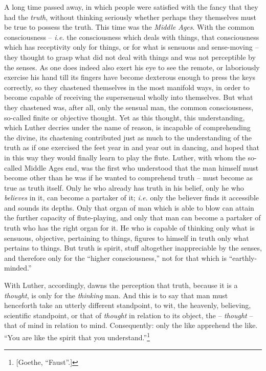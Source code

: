 \documentclass[12pt,a4paper]{book}
\begin{document}
A long time passed away, in which people were satisfied with the fancy that 
they had the \textit{truth}, without thinking seriously whether perhaps they 
themselves must be true to possess the truth. This time was the \textit{Middle 
Ages}. With the common consciousness -- \textit{i.e.} the consciousness which 
deals with things, that consciousness which has receptivity only for things, 
or for what is sensuous and sense-moving -- they thought to grasp what did not 
deal with things and was not perceptible by the senses. As one does indeed 
also exert his eye to see the remote, or laboriously exercise his hand till 
its fingers have become dexterous enough to press the keys correctly, so they 
chastened themselves in the most manifold ways, in order to become capable of 
receiving the supersensual wholly into themselves. But what they chastened 
was, after all, only the sensual man, the common consciousness, so-called 
finite or objective thought. Yet as this thought, this understanding, which 
Luther decries under the name of reason, is incapable of comprehending the 
divine, its chastening contributed just as much to the understanding of the 
truth as if one exercised the feet year in and year out in dancing, and hoped 
that in this way they would finally learn to play the flute. Luther, with whom 
the so-called Middle Ages end, was the first who understood that the man 
himself must become other than he was if he wanted to comprehend truth -- must 
become as true as truth itself. Only he who already has truth in his belief, 
only he who \textit{believes} in it, can become a partaker of it; 
\textit{i.e.} only the believer finds it accessible and sounds its depths. 
Only that organ of man which is able to blow can attain the further capacity 
of flute-playing, and only that man can become a partaker of truth who has the 
right organ for it. He who is capable of thinking only what is sensuous, 
objective, pertaining to things, figures to himself in truth only what 
pertains to things. But truth is spirit, stuff altogether inappreciable by the 
senses, and therefore only for the ``higher consciousness,'' not for that 
which is ``earthly-minded.''

With Luther, accordingly, dawns the perception that truth, because it is a 
\textit{thought}, is only for the \textit{thinking} man. And this is to say 
that man must henceforth take an utterly different standpoint, to wit, the 
heavenly, believing, scientific standpoint, or that of \textit{thought} in 
relation to its object, the -- \textit{thought} -- that of mind in relation to 
mind. Consequently: only the like apprehend the like. ``You are like the 
spirit that you understand.''\footnote{[Goethe, ``Faust''.]}
\end{document}
